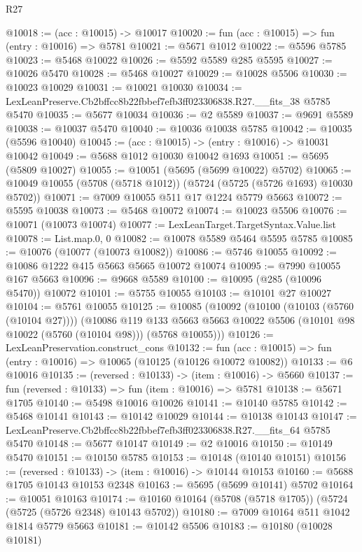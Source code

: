 \begin{lexlean}{R27}
\begin{coremodule}
@10018 := (acc : @10015) -> @10017
@10020 := fun (acc : @10015) => fun (entry : @10016) => @5781
@10021 := @5671 @1012
@10022 := @5596 @5785
@10023 := @5468 @10022
@10026 := @5592 @5589 @285 @5595
@10027 := @10026 @5470
@10028 := @5468 @10027
@10029 := @10028 @5506
@10030 := @10023 @10029
@10031 := @10021 @10030
@10034 := LexLeanPreserve.Cb2bffcc8b22fbbef7efb3ff023306838.R27.__fits_38 @5785 @5470
@10035 := @5677 @10034
@10036 := @2 @5589
@10037 := @9691 @5589
@10038 := @10037 @5470
@10040 := @10036 @10038 @5785
@10042 := @10035 (@5596 @10040)
@10045 := (acc : @10015) -> (entry : @10016) -> @10031 @10042
@10049 := @5688 @1012 @10030 @10042 @1693
@10051 := @5695 (@5809 @10027)
@10055 := @10051 (@5695 (@5699 @10022) @5702)
@10065 := @10049 @10055 (@5708 (@5718 @1012)) (@5724 (@5725 (@5726 @1693) @10030 @5702))
@10071 := @7009 @10055 @511 @17 @1224 @5779 @5663
@10072 := @5595 @10038
@10073 := @5468 @10072
@10074 := @10023 @5506
@10076 := @10071 (@10073 @10074)
@10077 := LexLeanTarget.TargetSyntax.Value.list
@10078 := List.map.{0, 0}
@10082 := @10078 @5589 @5464 @5595 @5785
@10085 := @10076 (@10077 (@10073 @10082))
@10086 := @5746 @10055
@10092 := @10086 @1222 @415 @5663 @5665 @10072 @10074
@10095 := @7990 @10055 @167 @5663
@10096 := @9668 @5589
@10100 := @10095 (@285 (@10096 @5470)) @10072
@10101 := @5755 @10055
@10103 := @10101 @27 @10027
@10104 := @5761 @10055
@10125 := @10085
    (@10092
      (@10100 (@10103 (@5760 (@10104 @27))))
      (@10086
        @119
        @133
        @5663
        @5663
        @10022
        @5506
        (@10101 @98 @10022 (@5760 (@10104 @98)))
        (@5768 @10055)))
@10126 := LexLeanPreservation.construct_cons
@10132 := fun (acc : @10015) => fun (entry : @10016) => @10065 (@10125 (@10126 @10072 @10082))
@10133 := @6 @10016
@10135 := (reversed : @10133) -> (item : @10016) -> @5660
@10137 := fun (reversed : @10133) => fun (item : @10016) => @5781
@10138 := @5671 @1705
@10140 := @5498 @10016 @10026
@10141 := @10140 @5785
@10142 := @5468 @10141
@10143 := @10142 @10029
@10144 := @10138 @10143
@10147 := LexLeanPreserve.Cb2bffcc8b22fbbef7efb3ff023306838.R27.__fits_64 @5785 @5470
@10148 := @5677 @10147
@10149 := @2 @10016
@10150 := @10149 @5470
@10151 := @10150 @5785
@10153 := @10148 (@10140 @10151)
@10156 := (reversed : @10133) -> (item : @10016) -> @10144 @10153
@10160 := @5688 @1705 @10143 @10153 @2348
@10163 := @5695 (@5699 @10141) @5702
@10164 := @10051 @10163
@10174 := @10160 @10164 (@5708 (@5718 @1705)) (@5724 (@5725 (@5726 @2348) @10143 @5702))
@10180 := @7009 @10164 @511 @1042 @1814 @5779 @5663
@10181 := @10142 @5506
@10183 := @10180 (@10028 @10181)

\end{coremodule}
\end{lexlean}
